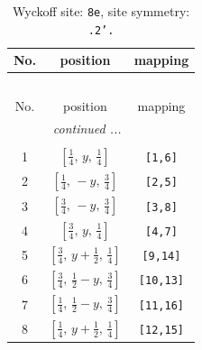\documentclass[fleqn,8pt]{jsarticle}
\begin{document}
\begin{longtable}{ccc}
\caption{Wyckoff site: {\tt 8e}, site symmetry: {\tt .2'.}}
 \\
 \hline \hline
No. & position & mapping \\ \hline \endfirsthead

\multicolumn{2}{l}{\tablename\ \thetable{}} \\
 \hline \hline
No. & position & mapping \\ \hline \endhead

 \hline \hline
\multicolumn{2}{r}{\footnotesize\it continued ...} \\ \endfoot

 \hline \hline
\multicolumn{2}{r}{} \\ \endlastfoot

1 & $\left[ \frac{1}{4},\, y,\, \frac{1}{4} \right]$ & {\tt [1,6]} \\ \hline
2 & $\left[ \frac{1}{4},\, - y,\, \frac{3}{4} \right]$ & {\tt [2,5]} \\ \hline
3 & $\left[ \frac{3}{4},\, - y,\, \frac{3}{4} \right]$ & {\tt [3,8]} \\ \hline
4 & $\left[ \frac{3}{4},\, y,\, \frac{1}{4} \right]$ & {\tt [4,7]} \\ \hline
5 & $\left[ \frac{3}{4},\, y + \frac{1}{2},\, \frac{1}{4} \right]$ & {\tt [9,14]} \\ \hline
6 & $\left[ \frac{3}{4},\, \frac{1}{2} - y,\, \frac{3}{4} \right]$ & {\tt [10,13]} \\ \hline
7 & $\left[ \frac{1}{4},\, \frac{1}{2} - y,\, \frac{3}{4} \right]$ & {\tt [11,16]} \\ \hline
8 & $\left[ \frac{1}{4},\, y + \frac{1}{2},\, \frac{1}{4} \right]$ & {\tt [12,15]} \\
\end{longtable}
\renewcommand{\arraystretch}{1.2}
\end{document}
